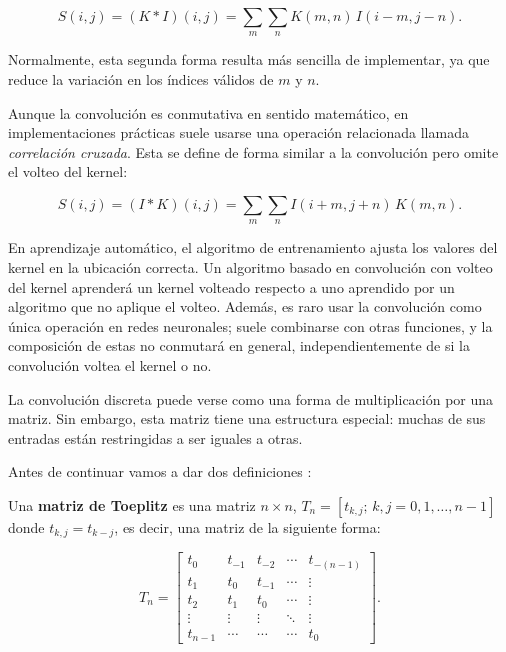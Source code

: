 \begin{equation}
S(i,j) = (K * I)(i,j) = \sum_m \sum_n  K(m,n) \,I(i - m, j - n).
\end{equation}

Normalmente, esta segunda forma resulta más sencilla de implementar, ya que reduce la variación en los índices válidos de $m$ y $n$.

Aunque la convolución es conmutativa en sentido matemático, en implementaciones prácticas suele usarse una operación relacionada llamada \emph{correlación cruzada}. Esta se define de forma similar a la convolución pero omite el volteo del kernel:

\begin{equation}
S(i,j) = (I * K)(i,j) = \sum_m \sum_n I(i + m, j + n) \, K(m,n).
\end{equation}

En aprendizaje automático, el algoritmo de entrenamiento ajusta los valores del kernel en la ubicación correcta. Un algoritmo basado en convolución con volteo del kernel aprenderá un kernel volteado respecto a uno aprendido por un algoritmo que no aplique el volteo. Además, es raro usar la convolución como única operación en redes neuronales; suele combinarse con otras funciones, y la composición de estas no conmutará en general, independientemente de si la convolución voltea el kernel o no.

La convolución discreta puede verse como una forma de multiplicación por una matriz. Sin embargo, esta matriz tiene una estructura especial: muchas de sus entradas están restringidas a ser iguales a otras. 

Antes de continuar vamos a dar dos definiciones \parencite{gray2006toeplitz}: 

\begin{definicion}
Una \textbf{matriz de Toeplitz} es una matriz $n \times n$,  $T_n = [t_{k,j}; \, k, j = 0, 1, \ldots, n-1]$  
donde $t_{k,j} = t_{k - j}$, es decir, una matriz de la siguiente forma:


\begin{equation}
T_n = 
\begin{bmatrix}
t_0 & t_{-1} & t_{-2} & \cdots & t_{-(n-1)} \\
t_1 & t_0 & t_{-1} & \cdots & \vdots \\
t_2 & t_1 & t_0 & \cdots & \vdots \\
\vdots & \vdots & \vdots & \ddots & \vdots \\
t_{n-1} & \cdots & \cdots & \cdots & t_0
\end{bmatrix}.
\end{equation}
\end{definicion}

